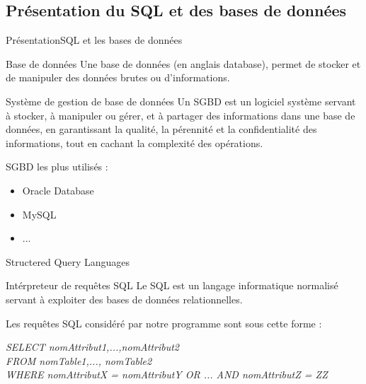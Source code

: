 \documentclass[10pt,handout]{beamer}
\begin{document}
\subsection{Présentation du SQL et des bases de données}
\begin{frame}{Présentation}{SQL et les bases de données}
  \begin{block}{Base de données}
    Une base de données (en anglais database), permet de stocker et de manipuler des données brutes ou d'informations.
  \end{block}

  \begin{block}{Système de gestion de base de données}
    Un SGBD est un logiciel système servant à stocker, à manipuler ou gérer, et à partager des informations dans une base de données, en garantissant la qualité, la pérennité et la confidentialité des informations, tout en cachant la complexité des opérations.
  \end{block}

  SGBD les plus utilisés :
    \begin{itemize}
      \item Oracle Database
      \item MySQL
      \item ...
    \end{itemize}
  
\end{frame}

\begin{frame}{Structered Query Languages}
  \begin{block}{Intérpreteur de requêtes SQL}
    Le SQL est un langage informatique normalisé servant à exploiter des bases de données relationnelles.
  \end{block}

  Les requêtes SQL considéré par notre programme sont sous cette forme :
  
  \begin{block}
    
    \textit{SELECT nomAttribut1,...,nomAttribut2 \\ FROM nomTable1,..., nomTable2 \\ WHERE nomAttributX = nomAttributY OR ... AND nomAttributZ = ZZ}
  \end{block}

\end{frame}

\end{document}
